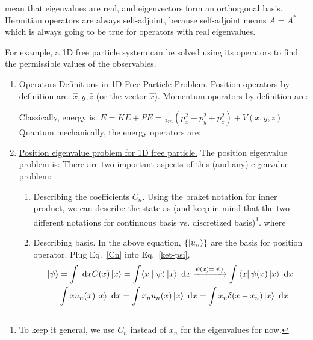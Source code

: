 \documentclass{school-22.101-notes}
\begin{document}
 mean that eigenvalues are real, and eigenvectors form an orthorgonal basis. Hermitian operators are always self-adjoint, because self-adjoint means $A = A^*$ which is always going to be true for operators with real eigenvalues. 


For example, a 1D free particle system can be solved using its operators to find the permissible values of the observables. 
\begin{enumerate}
\item \uline{Operators Definitions in 1D Free Particle Problem.} Position operators by definition are: $\hat{x}, \hat{y}, \hat{z}$ (or the vector $\hat{\underline{x}}$). Momentum operators by definition are:

  Classically, energy is: $E = KE + PE = \frac{1}{2m} (p_x^2 + p_y^2 + p_z^2) + V(x,y,z)$. Quantum mechanically, the energy operators are:



\item \uline{Position eigenvalue problem for 1D free particle.} The position eigenvalue problem is:
  There are two important aspects of this (and any) eigenvalue problem: 
  \begin{enumerate}
  \item Describing the coefficients $C_n$. Using the braket notation for inner product, we can describe the state as (and keep in mind that the two different notations for continuous basis vs. discretized basis)\footnote{To keep it general, we use $C_n$ instead of $x_n$ for the eigenvalues for now.}. 
    where 


  \item Describing basis. In the above equation, $\left\{ \left| u_n \right> \right\}$ are the basis for position operator. 
    Plug Eq.~\ref{Cn} into Eq.~\ref{ket-psi}, 
    \begin{align}
      \left| \psi \right> &= \int \mbox{ }\mathrm{d} x C(x) \left| x \right> = \int \langle x \mid \psi \rangle \left| x \right> \mbox{ }\mathrm{d} x \xrightarrow{\psi(x) = \left| \psi \right>} \int \left< x \right| \psi(x) \left| x \right> \mbox{ }\mathrm{d} x \\
      &\int x u_n(x)\left| x \right> \mbox{ }\mathrm{d} x = \int x_n u_n (x) \left| x \right> \mbox{ }\mathrm{d} x = \int x_n \delta (x-x_n) \left| x \right> \mbox{ }\mathrm{d} x  
    \end{align}


\end{enumerate}
\end{enumerate}
\end{document}
